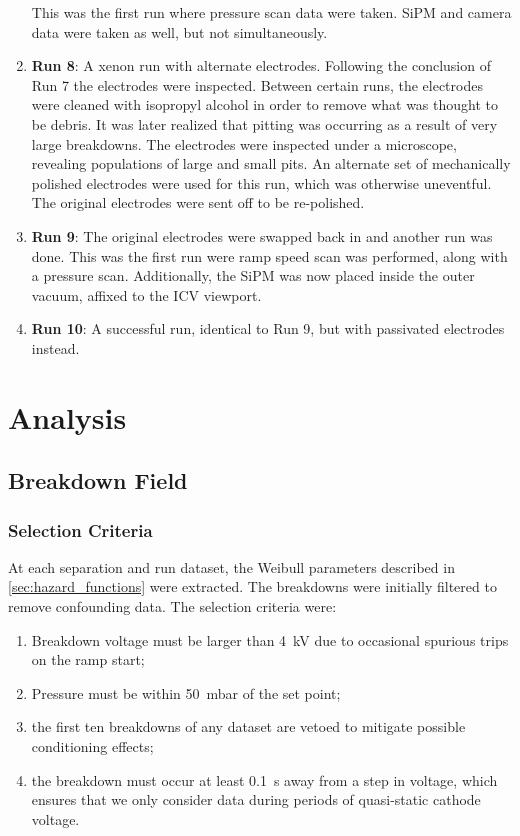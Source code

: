 \begin{enumerate}
    This was the first run where pressure scan data were taken.
    SiPM and camera data were taken as well, but not simultaneously.
    \item \textbf{Run 8}: A xenon run with alternate electrodes. Following the conclusion of Run 7 the electrodes were inspected. Between certain runs, the electrodes were cleaned with isopropyl alcohol in order to remove what was thought to be debris.
    It was later realized that pitting was occurring as a result of very large breakdowns.
    The electrodes were inspected under a microscope, revealing populations of large and small pits.
    An alternate set of mechanically polished electrodes were used for this run, which was otherwise uneventful.
    The original electrodes were sent off to be re-polished.
    \item \textbf{Run 9}: The original electrodes were swapped back in and another run was done. 
    This was the first run were ramp speed scan was performed, along with a pressure scan.
    Additionally, the SiPM was now placed inside the outer vacuum, affixed to the ICV viewport.
    \item \textbf{Run 10}: A successful run, identical to Run 9, but with passivated electrodes instead.
\end{enumerate}
\afterpage{\FloatBarrier}
\section{Analysis}
\subsection{Breakdown Field}
\subsubsection{Selection Criteria}
At each separation and run dataset, the Weibull parameters described in \ref{sec:hazard_functions} were extracted.
The breakdowns were initially filtered to remove confounding data.
The selection criteria were: 
\begin{enumerate}
 \item Breakdown voltage must be larger than 4~kV due to occasional spurious trips on the ramp start;
 \item Pressure must be within 50~mbar of the set point; 
 \item  the first ten breakdowns of any dataset are vetoed to mitigate possible conditioning effects; 
 \item the breakdown must occur at least 0.1~s away from a step in voltage, which ensures that we only consider data during periods of quasi-static cathode voltage. 
\end{enumerate}

